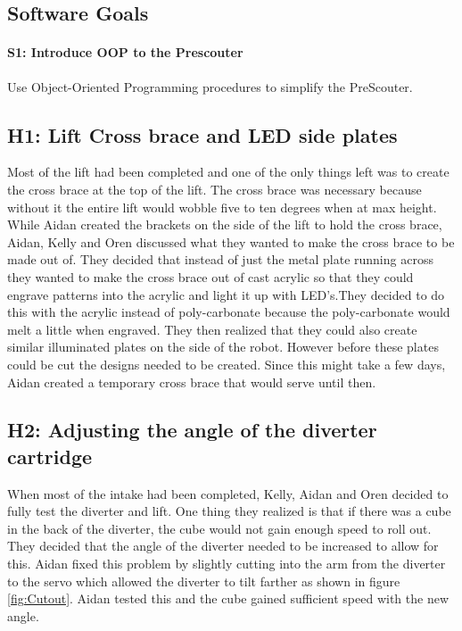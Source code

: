 \documentclass{article}
\begin{document}
\subsection{Software Goals}
\paragraph{S1: Introduce OOP to the Prescouter}
 Use Object-Oriented Programming procedures to simplify the PreScouter.
\newpage
\subsection{H1: Lift Cross brace and LED side plates}

Most of the lift had been completed and one of the only things left was to create the cross brace at the top of the lift. The cross brace was necessary because without it the entire lift would wobble five to ten degrees when at max height. While Aidan created the brackets on the side of the lift to hold the cross brace, Aidan, Kelly and Oren discussed what they wanted to make the cross brace to be made out of. They decided that instead of just the metal plate running across they wanted to make the cross brace out of cast acrylic so that they could engrave patterns into the acrylic and light it up with LED's.They decided to do this with the acrylic instead of poly-carbonate because the poly-carbonate would melt a little when engraved. They then realized that they could also create similar illuminated plates on the side of the robot. However before these plates could be cut the designs needed to be created. Since this might take a few days, Aidan created a temporary cross brace that would serve until then.

\subsection{H2: Adjusting the angle of the diverter cartridge}

When most of the intake had been completed, Kelly, Aidan and Oren decided to fully test the diverter and lift. One thing they realized is that if there was a cube in the back of the diverter, the cube would not gain enough speed to roll out. They decided that the angle of the diverter needed to be increased to allow for this. Aidan fixed this problem by slightly cutting into the arm from the diverter to the servo which allowed the diverter to tilt farther as shown in figure \ref{fig:Cutout}. Aidan tested this and the cube gained sufficient speed with the new angle.
\end{document}
